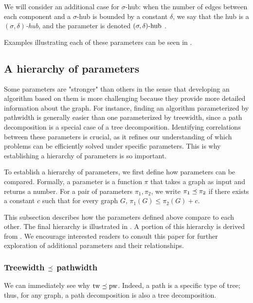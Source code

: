 \medskip

We will consider an additional case for $\sigma$-hub: when the number of edges between each component and a $\sigma$-hub is bounded by a constant $\delta$, we say that the hub is a \textit{$(\sigma, \delta)$-hub}, and the parameter is denoted $(\sigma, \delta)\text{-hub}$ \cite{esmer2024fundamental}.

Examples illustrating each of these parameters can be seen in .



\subsection{A hierarchy of parameters}

Some parameters are "stronger" than others in the sense that developing an algorithm based on them is more challenging because they provide more detailed information about the graph. For instance, finding an algorithm parameterized by pathwidth is generally easier than one parameterized by treewidth, since a path decomposition is a special case of a tree decomposition. Identifying correlations between these parameters is crucial, as it refines our understanding of which problems can be efficiently solved under specific parameters. This is why establishing a hierarchy of parameters is so important.

To establish a hierarchy of parameters, we first define how parameters can be compared. Formally, a parameter is a function $\pi$ that takes a graph as input and returns a number. For a pair of parameters $\pi_1, \pi_2$, we write $\pi_1 \preceq \pi_2$ if there exists a constant $c$ such that for every graph $G$, $\pi_1(G) \leq \pi_2(G) + c$.

This subsection describes how the parameters defined above compare to each other. The final hierarchy is illustrated in . A portion of this hierarchy is derived from \cite{fellows2013towards}. We encourage interested readers to consult this paper for further exploration of additional parameters and their relationships.



\subsubsection*{Treewidth $\preceq$ pathwidth}

We can immediately see why $\text{tw} \preceq \text{pw}$. Indeed, a path is a specific type of tree; thus, for any graph, a path decomposition is also a tree decomposition.

